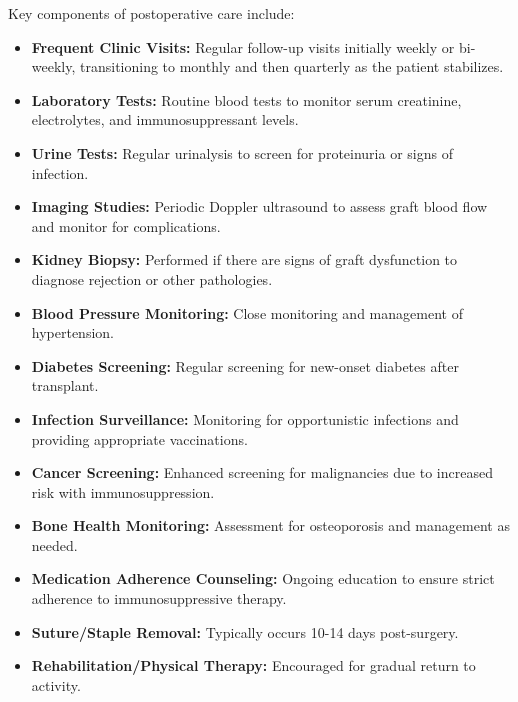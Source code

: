 Key components of postoperative care include:

\begin{itemize}
  \item \textbf{Frequent Clinic Visits:} Regular follow-up visits initially weekly or bi-weekly, transitioning to monthly and then quarterly as the patient stabilizes.
  
  \item \textbf{Laboratory Tests:} Routine blood tests to monitor serum creatinine, electrolytes, and immunosuppressant levels.
  
  \item \textbf{Urine Tests:} Regular urinalysis to screen for proteinuria or signs of infection.
  
  \item \textbf{Imaging Studies:} Periodic Doppler ultrasound to assess graft blood flow and monitor for complications.
  
  \item \textbf{Kidney Biopsy:} Performed if there are signs of graft dysfunction to diagnose rejection or other pathologies.
  
  \item \textbf{Blood Pressure Monitoring:} Close monitoring and management of hypertension.
  
  \item \textbf{Diabetes Screening:} Regular screening for new-onset diabetes after transplant.
  
  \item \textbf{Infection Surveillance:} Monitoring for opportunistic infections and providing appropriate vaccinations.
  
  \item \textbf{Cancer Screening:} Enhanced screening for malignancies due to increased risk with immunosuppression.
  
  \item \textbf{Bone Health Monitoring:} Assessment for osteoporosis and management as needed.
  
  \item \textbf{Medication Adherence Counseling:} Ongoing education to ensure strict adherence to immunosuppressive therapy.
  
  \item \textbf{Suture/Staple Removal:} Typically occurs 10-14 days post-surgery.
  
  \item \textbf{Rehabilitation/Physical Therapy:} Encouraged for gradual return to activity.
\end{itemize}

